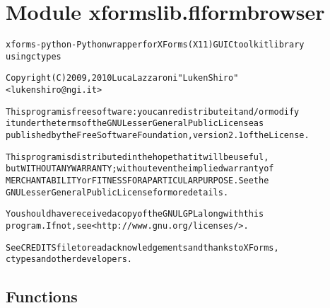 %
%
%


\section{Module xformslib.flformbrowser}

    \label{xformslib:flformbrowser}
\begin{alltt}

xforms-python - Python wrapper for XForms (X11) GUI C toolkit library
using ctypes

Copyright (C) 2009, 2010  Luca Lazzaroni "LukenShiro"
    {\textless}lukenshiro@ngi.it{\textgreater}

This program is free software: you can redistribute it and/or modify
it under the terms of the GNU Lesser General Public License as
published by the Free Software Foundation, version 2.1 of the License.

This program is distributed in the hope that it will be useful,
but WITHOUT ANY WARRANTY; without even the implied warranty of
MERCHANTABILITY or FITNESS FOR A PARTICULAR PURPOSE. See the
GNU Lesser General Public License for more details.

You should have received a copy of the GNU LGPL along with this
program. If not, see {\textless}http://www.gnu.org/licenses/{\textgreater}.

See CREDITS file to read acknowledgements and thanks to XForms,
ctypes and other developers.
\end{alltt}



  \subsection{Functions}

    \label{xformslib:flformbrowser:fl_addto_formbrowser}

